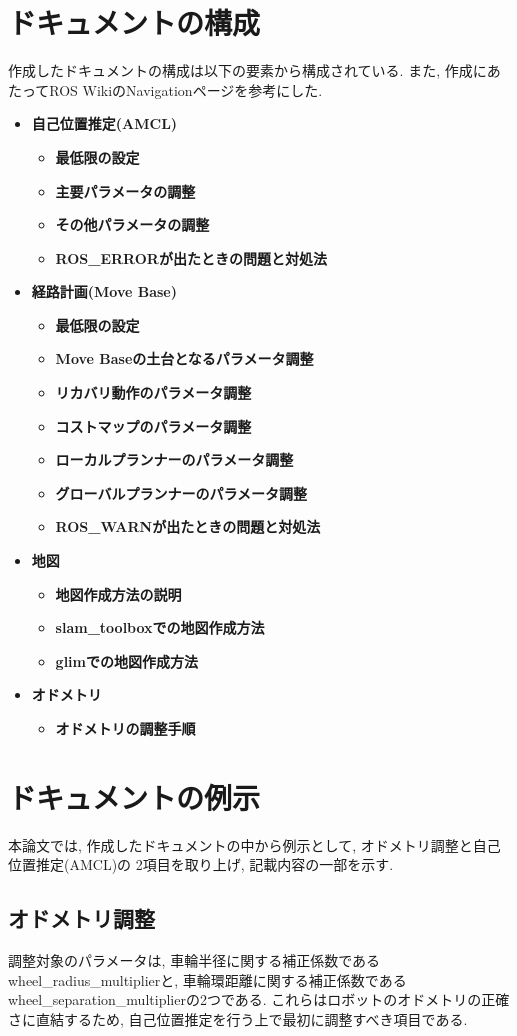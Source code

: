 \section{ドキュメントの構成}
作成したドキュメントの構成は以下の要素から構成されている. 
また, 作成にあたってROS WikiのNavigationページを参考にした.
\cite{ros_wiki_navigation}
\begin{itemize}
     \item \textbf{自己位置推定(AMCL)}
     \begin{itemize}
        \item \textbf{最低限の設定}
        \item \textbf{主要パラメータの調整}
        \item \textbf{その他パラメータの調整}
        \item \textbf{ROS\_ERRORが出たときの問題と対処法}
    \end{itemize}
     \item \textbf{経路計画(Move Base)}
    \begin{itemize}
        \item \textbf{最低限の設定}
        \item \textbf{Move Baseの土台となるパラメータ調整}
        \item \textbf{リカバリ動作のパラメータ調整}
        \item \textbf{コストマップのパラメータ調整}
        \item \textbf{ローカルプランナーのパラメータ調整}
        \item \textbf{グローバルプランナーのパラメータ調整}
        \item \textbf{ROS\_WARNが出たときの問題と対処法}
    \end{itemize}
\newpage
     \item \textbf{地図}
    \begin{itemize}
        \item \textbf{地図作成方法の説明}
        \item \textbf{slam\_toolboxでの地図作成方法}
        \item \textbf{glimでの地図作成方法}
    \end{itemize}
    \item \textbf{オドメトリ}
    \begin{itemize}
        \item \textbf{オドメトリの調整手順}
    \end{itemize}     
\end{itemize}

\section{ドキュメントの例示}
本論文では, 作成したドキュメントの中から例示として, オドメトリ調整と自己位置推定(AMCL)の
2項目を取り上げ, 記載内容の一部を示す. 

\subsection{オドメトリ調整}
調整対象のパラメータは, 車輪半径に関する補正係数であるwheel\_radius\_multiplierと, 車輪環距離に関する補正係数であるwheel\_separation\_multiplierの2つである. 
これらはロボットのオドメトリの正確さに直結するため, 自己位置推定を行う上で最初に調整すべき項目である. 



